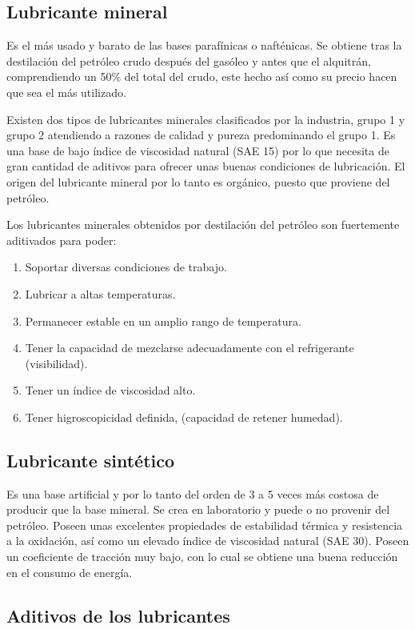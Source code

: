 \subsection{Lubricante mineral}

Es el más usado y barato de las bases parafínicas o nafténicas. Se obtiene tras la destilación del petróleo crudo después del gasóleo y antes que el alquitrán, comprendiendo un 50\% del total del crudo, este hecho así como su precio hacen que sea el más utilizado.

Existen dos tipos de lubricantes minerales clasificados por la industria, grupo 1 y grupo 2 atendiendo a razones de calidad y pureza predominando el grupo 1. Es una base de bajo índice de viscosidad natural (SAE 15) por lo que necesita de gran cantidad de aditivos para ofrecer unas buenas condiciones de lubricación. El origen del lubricante mineral por lo tanto es orgánico, puesto que proviene del petróleo.

Los lubricantes minerales obtenidos por destilación del petróleo son fuertemente aditivados para poder:
\begin{enumerate}
    
\item Soportar diversas condiciones de trabajo.
\item Lubricar a altas temperaturas.
\item Permanecer estable en un amplio rango de temperatura.
\item Tener la capacidad de mezclarse adecuadamente con el refrigerante (visibilidad).
\item Tener un índice de viscosidad alto.
\item Tener higroscopicidad definida, (capacidad de retener humedad).
\end{enumerate}

\subsection{Lubricante sintético}
Es una base artificial y por lo tanto del orden de 3 a 5 veces más costosa de producir que la base mineral. Se crea en laboratorio y puede o no provenir del petróleo. Poseen unas excelentes propiedades de estabilidad térmica y resistencia a la oxidación, así como un elevado índice de viscosidad natural (SAE 30). Poseen un coeficiente de tracción muy bajo, con lo cual se obtiene una buena reducción en el consumo de energía.

    
\subsection{Aditivos de los lubricantes}


